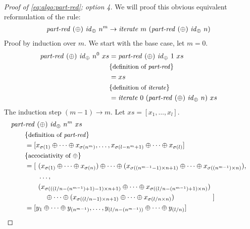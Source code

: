 \begin{proof}[Proof of \autoref{eq:algo:part-red}; option 4]
  We will proof this obvious equivalent reformulation of the rule:
  \begin{align*}
    \partRed\ (\oplus)\ \id_\oplus\ n^m \rightarrow \iterateN\ m\ (\partRed\ (\oplus)\ \id_\oplus\ n)
  \end{align*}
  Proof by induction over $m$. We start with the base case, let $m= 0$.
  \begin{align*}
    \partRed\ (\oplus)\ \id_\oplus\ n^0\ xs &= \partRed\ (\oplus)\ \id_\oplus\ 1\ xs\\
      & \comment{definition of \partRed}\\
      &= xs\\
      &\comment{definition of \iterateN}\\
      &= \iterateN\ 0\ (\partRed\ (\oplus)\ \id_\oplus\ n)\ xs\\
  \end{align*}
  The induction step $(m-1) \rightarrow m$.
  Let $xs = [x_1, \ldots, x_l]$.
  \begin{align*}
    &\partRed\ (\oplus)\ \id_\oplus\ n^m\ xs\\
    &\qquad \comment{definition of \partRed}\\
    &\qquad = [x_{\sigma(1)} \oplus \dots \oplus x_{\sigma(n^m)}, \ldots, x_{\sigma(l-n^m+1)} \oplus \dots \oplus x_{\sigma(l)}]\\
    &\qquad \comment{accociativity of $\oplus$}\\
    &\qquad = \begin{aligned}[t]
       [\ &(x_{\sigma(1)} \oplus \dots \oplus x_{\sigma(n)}) \oplus \dots \oplus (x_{\sigma((n^{m-1}-1)\times n +1)} \oplus \dots \oplus x_{\sigma((n^{m-1})\times n)}),\\
        &\ldots,\\
        &
          \begin{aligned}[b]
            &(x_{\sigma(((l/n-(n^{m-1})+1)-1)\times n + 1)} \oplus \dots \oplus x_{\sigma((l/n-(n^{m-1})+1)\times n)})\\
            &\quad \oplus \dots \oplus (x_{\sigma((l/n-1)\times n + 1)} \oplus \dots \oplus x_{\sigma(l/n\times n)})
          \end{aligned}\ ]\\
      \end{aligned}\\
    &\qquad = [y_1 \oplus \dots \oplus y_{(n^{m-1})}, \ldots, y_{(l/n - (n^{m-1}))} \oplus \dots \oplus y_{(l/n)}]\\

\end{align*}
\end{proof}

